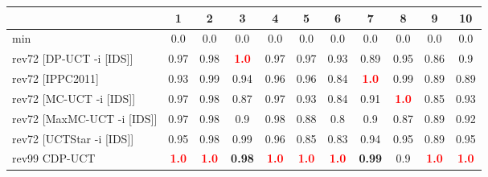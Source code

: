 \documentclass{article}
\begin{document}
\begin{tabular}{|l|r@{$\pm$}rr@{$\pm$}rr@{$\pm$}rr@{$\pm$}rr@{$\pm$}rr@{$\pm$}rr@{$\pm$}rr@{$\pm$}rr@{$\pm$}rr@{$\pm$}r|}
\hline

& \multicolumn{2}{c}{1}
& \multicolumn{2}{c}{2}
& \multicolumn{2}{c}{3}
& \multicolumn{2}{c}{4}
& \multicolumn{2}{c}{5}
& \multicolumn{2}{c}{6}
& \multicolumn{2}{c}{7}
& \multicolumn{2}{c}{8}
& \multicolumn{2}{c}{9}
& \multicolumn{2}{c|}{10}
\\
\hline
\hline
min
& \multicolumn{2}{c}{0.0}
& \multicolumn{2}{c}{0.0}
& \multicolumn{2}{c}{0.0}
& \multicolumn{2}{c}{0.0}
& \multicolumn{2}{c}{0.0}
& \multicolumn{2}{c}{0.0}
& \multicolumn{2}{c}{0.0}
& \multicolumn{2}{c}{0.0}
& \multicolumn{2}{c}{0.0}
& \multicolumn{2}{c|}{0.0}
\\
rev72 [DP-UCT -i [IDS]]
& \multicolumn{2}{c}{0.97}
& \multicolumn{2}{c}{0.98}
& \multicolumn{2}{c}{\textbf{\textcolor{red}{1.0}}}
& \multicolumn{2}{c}{0.97}
& \multicolumn{2}{c}{0.97}
& \multicolumn{2}{c}{0.93}
& \multicolumn{2}{c}{0.89}
& \multicolumn{2}{c}{0.95}
& \multicolumn{2}{c}{0.86}
& \multicolumn{2}{c|}{0.9}
\\
rev72 [IPPC2011]
& \multicolumn{2}{c}{0.93}
& \multicolumn{2}{c}{0.99}
& \multicolumn{2}{c}{0.94}
& \multicolumn{2}{c}{0.96}
& \multicolumn{2}{c}{0.96}
& \multicolumn{2}{c}{0.84}
& \multicolumn{2}{c}{\textbf{\textcolor{red}{1.0}}}
& \multicolumn{2}{c}{0.99}
& \multicolumn{2}{c}{0.89}
& \multicolumn{2}{c|}{0.89}
\\
rev72 [MC-UCT -i [IDS]]
& \multicolumn{2}{c}{0.97}
& \multicolumn{2}{c}{0.98}
& \multicolumn{2}{c}{0.87}
& \multicolumn{2}{c}{0.97}
& \multicolumn{2}{c}{0.93}
& \multicolumn{2}{c}{0.84}
& \multicolumn{2}{c}{0.91}
& \multicolumn{2}{c}{\textbf{\textcolor{red}{1.0}}}
& \multicolumn{2}{c}{0.85}
& \multicolumn{2}{c|}{0.93}
\\
rev72 [MaxMC-UCT -i [IDS]]
& \multicolumn{2}{c}{0.97}
& \multicolumn{2}{c}{0.98}
& \multicolumn{2}{c}{0.9}
& \multicolumn{2}{c}{0.98}
& \multicolumn{2}{c}{0.88}
& \multicolumn{2}{c}{0.8}
& \multicolumn{2}{c}{0.9}
& \multicolumn{2}{c}{0.87}
& \multicolumn{2}{c}{0.89}
& \multicolumn{2}{c|}{0.92}
\\
rev72 [UCTStar -i [IDS]]
& \multicolumn{2}{c}{0.95}
& \multicolumn{2}{c}{0.98}
& \multicolumn{2}{c}{0.99}
& \multicolumn{2}{c}{0.96}
& \multicolumn{2}{c}{0.85}
& \multicolumn{2}{c}{0.83}
& \multicolumn{2}{c}{0.94}
& \multicolumn{2}{c}{0.95}
& \multicolumn{2}{c}{0.89}
& \multicolumn{2}{c|}{0.95}
\\
\hline
rev99 CDP-UCT
& \multicolumn{2}{c}{\textbf{\textcolor{red}{1.0}}}
& \multicolumn{2}{c}{\textbf{\textcolor{red}{1.0}}}
& \multicolumn{2}{c}{\textbf{0.98}}
& \multicolumn{2}{c}{\textbf{\textcolor{red}{1.0}}}
& \multicolumn{2}{c}{\textbf{\textcolor{red}{1.0}}}
& \multicolumn{2}{c}{\textbf{\textcolor{red}{1.0}}}
& \multicolumn{2}{c}{\textbf{0.99}}
& \multicolumn{2}{c}{0.9}
& \multicolumn{2}{c}{\textbf{\textcolor{red}{1.0}}}
& \multicolumn{2}{c|}{\textbf{\textcolor{red}{1.0}}}
\\
\hline
\end{tabular}%
\end{document}
